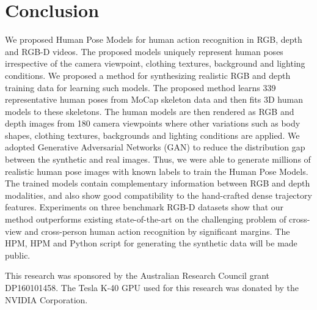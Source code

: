 \documentclass[twocolumn]{svjour3}          \smartqed  \usepackage{graphicx}
\begin{document}
\section{Conclusion}
We proposed Human Pose Models for human action recognition in RGB, depth and RGB-D videos. The proposed models uniquely represent human poses irrespective of the camera viewpoint, clothing textures, background and lighting conditions. We proposed a method for synthesizing realistic RGB and depth training data for learning such models. The proposed method learns 339 representative human poses from MoCap skeleton data and then fits 3D human models to these skeletons. The human models are then rendered as RGB and depth images from 180 camera viewpoints where other variations such as body shapes, clothing textures, backgrounds and lighting conditions are applied. We adopted Generative Adversarial Networks (GAN) to reduce the distribution gap between the synthetic and real images. Thus, we were able to generate millions of realistic human pose images with known labels to train the Human Pose Models. The trained models contain complementary information between RGB and depth modalities, and also show good compatibility to the hand-crafted dense trajectory features. Experiments on three benchmark RGB-D datasets show that our method outperforms existing state-of-the-art on the challenging problem of cross-view and cross-person human action recognition by significant margins. The HPM, HPM and Python script for generating the synthetic data will be made public.













\begin{acknowledgements}
This research was sponsored by the Australian Research Council grant DP160101458. The Tesla K-40 GPU used for this research was donated by the NVIDIA Corporation.
\end{acknowledgements}

\balance

         
\end{document}
